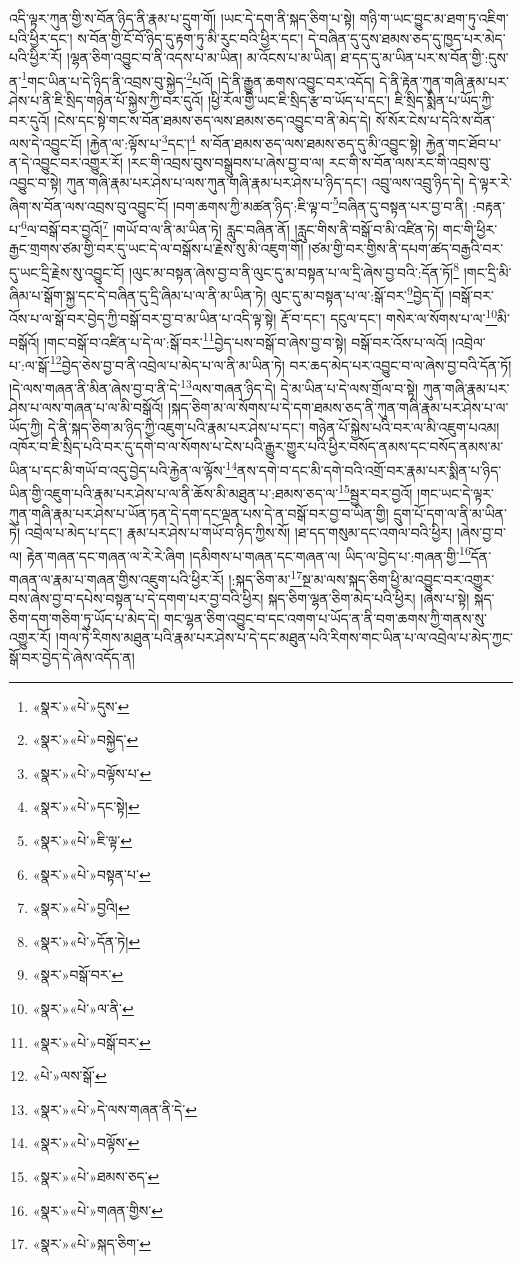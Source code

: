 འདི་ལྟར་ཀུན་གྱི་ས་བོན་ཉིད་ནི་རྣམ་པ་དྲུག་གོ། །ཡང་དེ་དག་ནི་སྐད་ཅིག་པ་སྟེ། གཉི་ག་ཡང་བྱུང་མ་ཐག་ཏུ་འཇིག་པའི་ཕྱིར་དང་། ས་བོན་གྱི་ངོ་བོ་ཉིད་དུ་རྟག་ཏུ་མི་རུང་བའི་ཕྱིར་དང་། དེ་བཞིན་དུ་དུས་ཐམས་ཅད་དུ་ཁྱད་པར་མེད་པའི་ཕྱིར་རོ། །ལྷན་ཅིག་འབྱུང་བ་ནི་འདས་པ་མ་ཡིན། མ་འོངས་པ་མ་ཡིན། ཐ་དད་དུ་མ་ཡིན་པར་ས་བོན་གྱི་:དུས་ན་\footnote{«སྣར་»«པེ་»དུས་}གང་ཡིན་པ་དེ་ཉིད་ནི་འབྲས་བུ་སྐྱེད་\footnote{«སྣར་»«པེ་»བསྐྱེད་}པའོ། །དེ་ནི་རྒྱུན་ཆགས་འབྱུང་བར་འདོད། དེ་ནི་རྟེན་ཀུན་གཞི་རྣམ་པར་ཤེས་པ་ནི་ཇི་སྲིད་གཉེན་པོ་སྐྱེས་ཀྱི་བར་དུའོ། །ཕྱི་རོལ་གྱི་ཡང་ཇི་སྲིད་རྩ་བ་ཡོད་པ་དང་། ཇི་སྲིད་སྨིན་པ་ཡོད་ཀྱི་བར་དུའོ། །ངེས་དང་སྟེ་གང་ས་བོན་ཐམས་ཅད་ལས་ཐམས་ཅད་འབྱུང་བ་ནི་མེད་དེ། སོ་སོར་ངེས་པ་དེའི་ས་བོན་ལས་དེ་འབྱུང་ངོ། །རྐྱེན་ལ་:ལྟོས་པ་\footnote{«སྣར་»«པེ་»བལྟོས་པ་}དང་།\footnote{«སྣར་»«པེ་»དང་སྟེ།} ས་བོན་ཐམས་ཅད་ལས་ཐམས་ཅད་དུ་མི་འབྱུང་སྟེ། རྐྱེན་གང་ཐོབ་པ་ན་དེ་འབྱུང་བར་འགྱུར་རོ། །རང་གི་འབྲས་བུས་བསྒྲུབས་པ་ཞེས་བྱ་བ་ལ། རང་གི་ས་བོན་ལས་རང་གི་འབྲས་བུ་འབྱུང་བ་སྟེ། ཀུན་གཞི་རྣམ་པར་ཤེས་པ་ལས་ཀུན་གཞི་རྣམ་པར་ཤེས་པ་ཉིད་དང་། འབྲུ་ལས་འབྲུ་ཉིད་དེ། དེ་ལྟར་རེ་ཞིག་ས་བོན་ལས་འབྲས་བུ་འབྱུང་ངོ། །བག་ཆགས་ཀྱི་མཚན་ཉིད་:ཇི་ལྟ་བ་\footnote{«སྣར་»«པེ་»ཇི་ལྟ་}བཞིན་དུ་བསྟན་པར་བྱ་བ་ནི། :བརྟན་པ་\footnote{«སྣར་»«པེ་»བསྟན་པ་}ལ་བསྒོ་བར་བྱའོ།\footnote{«སྣར་»«པེ་»བྱའི།} །གཡོ་བ་ལ་ནི་མ་ཡིན་ཏེ། རླུང་བཞིན་ནོ། །རླུང་གིས་ནི་བསྒོ་བ་མི་འཛིན་ཏེ། གང་གི་ཕྱིར་རྒྱང་གྲགས་ཙམ་གྱི་བར་དུ་ཡང་དེ་ལ་བསྒོས་པ་རྗེས་སུ་མི་འཇུག་གོ། །ཙམ་གྱི་བར་གྱིས་ནི་དཔག་ཚད་བརྒྱའི་བར་དུ་ཡང་དྲི་རྗེས་སུ་འབྱུང་ངོ། །ལུང་མ་བསྟན་ཞེས་བྱ་བ་ནི་ལུང་དུ་མ་བསྟན་པ་ལ་དྲི་ཞེས་བྱ་བའི་:དོན་ཏོ།\footnote{«སྣར་»«པེ་»དོན་ཏེ།} །གང་དྲི་མི་ཞིམ་པ་སྒོག་སྐྱ་དང་དེ་བཞིན་དུ་དྲི་ཞིམ་པ་ལ་ནི་མ་ཡིན་ཏེ། ལུང་དུ་མ་བསྟན་པ་ལ་:སྒོ་བར་\footnote{«སྣར་»བསྒོ་བར་}བྱེད་དོ། །བསྒོ་བར་འོས་པ་ལ་སྒོ་བར་བྱེད་ཀྱི་བསྒོ་བར་བྱ་བ་མ་ཡིན་པ་འདི་ལྟ་སྟེ། རྡོ་བ་དང་། དངུལ་དང་། གསེར་ལ་སོགས་པ་ལ་\footnote{«སྣར་»«པེ་»ལ་ནི་}མི་བསྒོའོ། །གང་བསྒོ་བ་འཛིན་པ་དེ་ལ་:སྒོ་བར་\footnote{«སྣར་»«པེ་»བསྒོ་བར་}བྱེད་པས་བསྒོ་བ་ཞེས་བྱ་བ་སྟེ། བསྒོ་བར་འོས་པ་ལའོ། །འབྲེལ་པ་:ལ་སྒོ་\footnote{«པེ་»ལས་སྒོ་}བྱེད་ཅེས་བྱ་བ་ནི་འབྲེལ་པ་མེད་པ་ལ་ནི་མ་ཡིན་ཏེ། བར་ཆད་མེད་པར་འབྱུང་བ་ལ་ཞེས་བྱ་བའི་དོན་ཏོ། །དེ་ལས་གཞན་ནི་མིན་ཞེས་བྱ་བ་ནི་དེ་\footnote{«སྣར་»«པེ་»དེ་ལས་གཞན་ནི་དེ་}ལས་གཞན་ཉིད་དེ། དེ་མ་ཡིན་པ་དེ་ལས་གྲོལ་བ་སྟེ། ཀུན་གཞི་རྣམ་པར་ཤེས་པ་ལས་གཞན་པ་ལ་མི་བསྒོའོ། །སྐད་ཅིག་མ་ལ་སོགས་པ་དེ་དག་ཐམས་ཅད་ནི་ཀུན་གཞི་རྣམ་པར་ཤེས་པ་ལ་ཡོད་ཀྱི། དེ་ནི་སྐད་ཅིག་མ་ཉིད་ཀྱི་འཇུག་པའི་རྣམ་པར་ཤེས་པ་དང་། གཉེན་པོ་སྐྱེས་པའི་བར་ལ་མི་འཇུག་པའམ། འཁོར་བ་ཇི་སྲིད་པའི་བར་དུ་དགེ་བ་ལ་སོགས་པ་ངེས་པའི་རྒྱུར་གྱུར་པའི་ཕྱིར་བསོད་ནམས་དང་བསོད་ནམས་མ་ཡིན་པ་དང་མི་གཡོ་བ་འདུ་བྱེད་པའི་རྐྱེན་ལ་ལྟོས་\footnote{«སྣར་»«པེ་»བལྟོས་}ནས་དགེ་བ་དང་མི་དགེ་བའི་འགྲོ་བར་རྣམ་པར་སྨིན་པ་ཉིད་ཡིན་གྱི་འཇུག་པའི་རྣམ་པར་ཤེས་པ་ལ་ནི་ཆོས་མི་མཐུན་པ་:ཐམས་ཅད་ལ་\footnote{«སྣར་»«པེ་»ཐམས་ཅད་}སྦྱར་བར་བྱའོ། །གང་ཡང་དེ་ལྟར་ཀུན་གཞི་རྣམ་པར་ཤེས་པ་ཡོན་ཏན་དེ་དག་དང་ལྡན་པས་དེ་ན་བསྒོ་བར་བྱ་བ་ཡིན་གྱི། དྲུག་པོ་དག་ལ་ནི་མ་ཡིན་ཏེ། འབྲེལ་པ་མེད་པ་དང་། རྣམ་པར་ཤེས་པ་གཡོ་བ་ཉིད་ཀྱིས་སོ། །ཐ་དད་གསུམ་དང་འགལ་བའི་ཕྱིར། །ཞེས་བྱ་བ་ལ། རྟེན་གཞན་དང་གཞན་ལ་རེ་རེ་ཞིག །དམིགས་པ་གཞན་དང་གཞན་ལ། ཡིད་ལ་བྱེད་པ་:གཞན་གྱི་\footnote{«སྣར་»«པེ་»གཞན་གྱིས་}དོན་གཞན་ལ་རྣམ་པ་གཞན་གྱིས་འཇུག་པའི་ཕྱིར་རོ། །:སྐད་ཅིག་མ་\footnote{«སྣར་»«པེ་»སྐད་ཅིག་}སྔ་མ་ལས་སྐད་ཅིག་ཕྱི་མ་འབྱུང་བར་འགྱུར་བས་ཞེས་བྱ་བ་དཔེས་བསྟན་པ་དེ་དགག་པར་བྱ་བའི་ཕྱིར། སྐད་ཅིག་ལྷན་ཅིག་མེད་པའི་ཕྱིར། །ཞེས་པ་སྟེ། སྐད་ཅིག་དག་གཅིག་ཏུ་ཡོད་པ་མེད་དེ། གང་ལྷན་ཅིག་འབྱུང་བ་དང་འགག་པ་ཡོད་ན་ནི་བག་ཆགས་ཀྱི་གནས་སུ་འགྱུར་རོ། །གལ་ཏེ་རིགས་མཐུན་པའི་རྣམ་པར་ཤེས་པ་དེ་དང་མཐུན་པའི་རིགས་གང་ཡིན་པ་ལ་འབྲེལ་པ་མེད་ཀྱང་སྒོ་བར་བྱེད་དེ་ཞེས་འདོད་ན། 